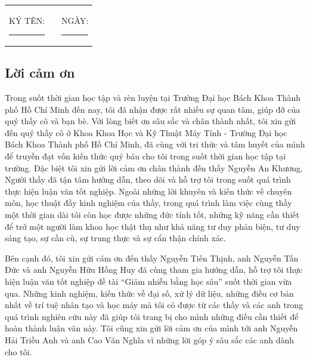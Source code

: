 \documentclass[a4paper, oneside, 13pt]{book}
\begin{document}
	\vspace{1cm}
	
	\begin{center}
		\begin{tabular}{c c c}
			KÝ TÊN: \rule{4cm}{0.15mm} &\hspace{4cm}& NGÀY: \rule{4cm}{0.15mm}
		\end{tabular}
	\end{center}
\setlength{\parskip}{0mm}

\newpage
\setlength{\parskip}{2.5mm}
\thispagestyle{plain}
	\begin{center}
		\section*{Lời cảm ơn}
	\end{center}
	
	Trong suốt thời gian học tập và rèn luyện tại Trường Đại học Bách Khoa Thành phố Hồ Chí Minh đến nay, tôi đã nhận được rất nhiều sự quan tâm, giúp đỡ của quý thầy cô và bạn bè. Với lòng biết ơn sâu sắc và chân thành nhất, tôi xin gửi đến quý thầy cô ở Khoa Khoa Học và Kỹ Thuật Máy Tính - Trường Đại học Bách Khoa Thành phố Hồ Chí Minh, đã cùng với tri thức và tâm huyết của mình để truyền đạt vốn kiến thức quý báu cho tôi trong suốt thời gian học tập tại trường. Đặc biệt tôi xin gửi lời cảm ơn chân thành đến thầy Nguyễn An Khương. Người thầy đã tận tâm hướng dẫn, theo dõi và hỗ trợ tôi trong suốt quá trình thực hiện luận văn tốt nghiệp. Ngoài những lời khuyên và kiến thức về chuyên môn, học thuật đầy kinh nghiệm của thầy, trong quá trình làm việc cùng thầy một thời gian dài tôi còn học được những đức tính tốt, những kỹ năng cần thiết để trở một người làm khoa học thật thụ như khả năng tư duy phản biện, tư duy sáng tạo, sự cần cù, sự trung thực và sự cẩn thận chính xác.
	
	Bên cạnh đó, tôi xin gửi cám ơn đến thầy Nguyễn Tiến Thịnh, anh Nguyễn Tấn Đức và anh Nguyễn Hữu Hồng Huy đã cùng tham gia hướng dẫn, hỗ trợ tôi thực hiện luận văn tốt nghiệp đề tài ``Giảm nhiễu bằng học sâu'' suốt thời gian vừa qua. Những kinh nghiệm, kiến thức về đại số, xử lý dữ liệu, những điều cơ bản nhất về trí tuệ nhân tạo và học máy mà tôi có được từ các thầy và các anh trong quá trình nghiên cứu này đã giúp tôi trang bị cho mình những điều cần thiết để hoàn thành luận văn này. Tôi cũng xin gửi lời cảm ơn của mình tới anh Nguyễn Hải Triều Anh và anh Cao Văn Nghĩa vì những lời góp ý sâu sắc các anh dành cho tôi.
	
\end{document}
